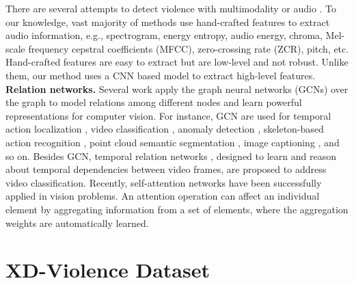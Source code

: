 \documentclass[runningheads]{llncs}
\begin{document}
There are several attempts to detect violence with multimodality or audio \cite{zajdel2007cassandra,lin2009weakly,giannakopoulos2010audio,penet2012multimodal,giannakopoulos2007multi,giannakopoulos2010multimodal}. To our knowledge, vast majority of methods use hand-crafted features to extract audio information, e.g., spectrogram, energy entropy, audio energy, chroma, Mel-scale frequency cepstral coefficients (MFCC), zero-crossing rate (ZCR), pitch, etc. Hand-crafted features are easy to extract but are low-level and not robust. Unlike them, our method uses a CNN based model to extract high-level features.\\
\noindent\textbf{Relation networks.} Several work apply the graph neural networks (GCNs) \cite{kipf2016semi,velivckovic2017graph} over the graph to model relations among different nodes and learn powerful representations for computer vision. For instance, GCN are used for temporal action localization \cite{zeng2019graph}, video classification \cite{sun2018actor,wang2018videos}, anomaly detection \cite{zhong2019graph}, skeleton-based action recognition \cite{shi2019two,yan2018spatial}, point cloud semantic segmentation \cite{li2019deepgcns}, image captioning \cite{yao2018exploring}, and so on. Besides GCN, temporal relation networks \cite{zhou2018temporal}, designed to learn and reason about temporal dependencies between video frames, are proposed to address video classification. Recently, self-attention networks \cite{wang2018non,yue2018compact,fu2019dual,hu2018relation} have been successfully applied in vision problems. An attention operation can affect an individual element by aggregating information from a set of elements, where the aggregation weights are automatically learned.

\section{XD-Violence Dataset}
\end{document}
